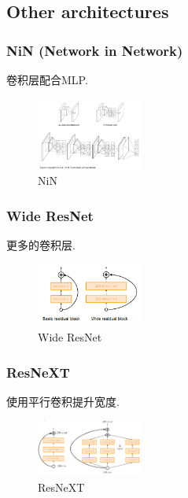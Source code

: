 \subsection{Other architectures}
\subsubsection{NiN (Network in Network)}
卷积层配合MLP. 

\begin{figure}[!htb]
    \centering
    \includegraphics[width=0.309\textwidth]{pic/Lec9/NiN.png}
    \caption{NiN}
\end{figure}

\subsubsection{Wide ResNet}
更多的卷积层. 
\begin{figure}[!htb]
    \centering
    \includegraphics[width=0.309\textwidth]{pic/Lec9/Wide ResNet}
    \caption{Wide ResNet}
\end{figure}

\subsubsection{ResNeXT}
使用平行卷积提升宽度. 

\begin{figure}[!htb]
    \centering
    \includegraphics[width=0.309\textwidth]{pic/Lec9/ResNeXT}
    \caption{ResNeXT}
\end{figure}

